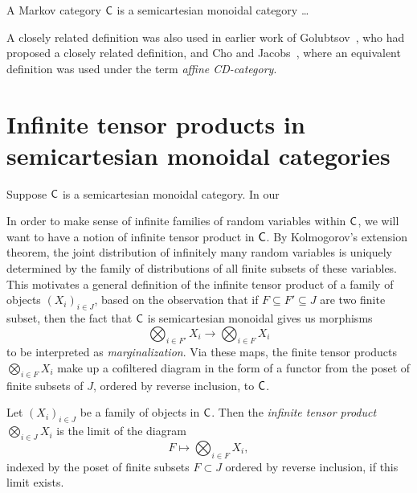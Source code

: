 \documentclass[11pt]{article}
\begin{document}
\begin{definition}
	A Markov category $\mathsf{C}$ is a semicartesian monoidal category \ldots
	\label{markov_cat}
\end{definition}

A closely related definition was also used in earlier work of Golubtsov~\cite{golubtsov}, who had proposed a closely related definition, and Cho and Jacobs~\cite{cho_jacobs}, where an equivalent definition was used under the term \emph{affine CD-category}.


\section{Infinite tensor products in semicartesian monoidal categories}
\label{infprod_semicartesian}


Suppose $\mathsf{C}$ is a semicartesian monoidal category. In our 

In order to make sense of infinite families of random variables within $\mathsf{C}$,
we will want to have a notion of infinite tensor product in $\mathsf{C}$. By Kolmogorov's extension theorem, the joint distribution of infinitely many random variables is uniquely determined by the family of distributions of all finite subsets of these variables. This motivates a general definition of the infinite tensor product of a family of objects $(X_i)_{i \in J}$, based on the observation that if $F \subseteq F' \subseteq J$ are two finite subset, then the fact that $\mathsf{C}$ is semicartesian monoidal gives us morphisms
\[
	\bigotimes_{i \in F'} X_i \longrightarrow \bigotimes_{i \in F} X_i
\]
to be interpreted as \emph{marginalization}. Via these maps, the finite tensor products $\bigotimes_{i \in F} X_i$ make up a cofiltered diagram in the form of a functor from the poset of finite subsets of $J$, ordered by reverse inclusion, to $\mathsf{C}$.

\begin{definition}
    Let $(X_i)_{i \in J}$ be a family of objects in $\mathsf{C}$.
    Then the \emph{infinite tensor product} $\bigotimes_{i \in J} X_i$ is the limit of the diagram \[F \longmapsto \bigotimes_{i \in F} X_i,\]
    indexed by the poset of finite subsets $F \subset J$ ordered by reverse inclusion, if this limit exists.
\end{definition}
\end{document}
